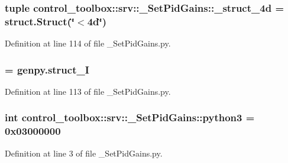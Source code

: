 \subsubsection[{\-\_\-struct\-\_\-4d}]{\setlength{\rightskip}{0pt plus 5cm}tuple {\bf control\-\_\-toolbox\-::srv\-::\-\_\-\-Set\-Pid\-Gains\-::\-\_\-struct\-\_\-4d} = struct.\-Struct(\char`\"{}$<$4d\char`\"{})}\label{namespacecontrol__toolbox_1_1srv_1_1__SetPidGains_a1dca3d1fb6c30969a4dcd857beb99d9c}


\-Definition at line 114 of file \-\_\-\-Set\-Pid\-Gains.\-py.

\subsubsection[{\-\_\-struct\-\_\-\-I}]{ = genpy.\-struct\-\_\-\-I}\label{namespacecontrol__toolbox_1_1srv_1_1__SetPidGains_ae31932516a8efa70bbf125837572b9e2}


\-Definition at line 113 of file \-\_\-\-Set\-Pid\-Gains.\-py.

\subsubsection[{python3}]{\setlength{\rightskip}{0pt plus 5cm}int {\bf control\-\_\-toolbox\-::srv\-::\-\_\-\-Set\-Pid\-Gains\-::python3} = 0x03000000}\label{namespacecontrol__toolbox_1_1srv_1_1__SetPidGains_af63e59f78c1f49256f56ea0e4a14ef1c}


\-Definition at line 3 of file \-\_\-\-Set\-Pid\-Gains.\-py.

